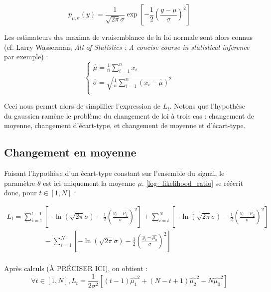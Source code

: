 \documentclass[french,12pt,notitlepage]{report}
\begin{document}
	\begin{equation*}
		p_{\mu, \sigma}(y) = \frac1{\sqrt{2 \pi} \sigma} \exp \left[ -\frac12 \left( \frac{y - \mu}{\sigma} \right)^2 \right]
	\end{equation*}

	Les estimateurs des maxima de vraisemblance de la loi normale sont alors connus (cf. Larry Wasserman, \textit{All of Statistics : A concise course in statistical inference} par exemple) :
	\begin{equation}
	\left\{
	\begin{array}{ll}
		\hat{\mu} = \frac{1}{n} \sum_{i=1}^n x_i \\
		\hat{\sigma} = \sqrt{\frac{1}{n} \sum_{i=1}^n (x_i - \hat{\mu})^2} \\
	\end{array}
	\right.
	\label{estimators}
	\end{equation}

	Ceci nous permet alors de simplifier l'expression de $L_t$. Notons que l'hypothèse du gaussien ramène le problème du changement de loi à trois cas : changement de moyenne, changement d'écart-type, et changement de moyenne et d'écart-type.

	\subsection{Changement en moyenne}
	Faisant l'hypothèse d'un écart-type constant sur l'ensemble du signal, le paramètre $\theta$ est ici uniquement la moyenne $\mu$. \ref{log_likelihood_ratio} se réécrit donc, pour $t \in [1,N]$ :

	\begin{equation*}
	\begin{array}{ll}
		L_t = \sum_{i=1}^{t-1} \left[-\ln (\sqrt{2 \pi} \sigma)-\frac{1}{2}\left( \frac{y_i-\hat{\mu_1}}{\sigma} \right) ^2 \right] + \sum_{i=t}^{N} \left[-\ln (\sqrt{2 \pi} \sigma)-\frac{1}{2}\left( \frac{y_i-\hat{\mu_2}}{\sigma} \right) ^2 \right] \\
		~~~~~~~~~~~~~~~~~~~~~~~~ - \sum_{i=1}^{N} \left[-\ln (\sqrt{2 \pi} \sigma)-\frac{1}{2}\left( \frac{y_i-\hat{\mu_0}}{\sigma} \right) ^2 \right] \\
	\end{array}
	\end{equation*}

	Après calculs (À PRÉCISER ICI), on obtient :
	\begin{equation}
		\forall t \in [1, N], L_t = \frac{1}{2 \sigma ^2}\left[(t-1)\hat{\mu_1}^2 + (N - t + 1)\hat{\mu_2}^2 - N\hat{\mu_0}^2 \right]
		\label{meanchange}
	\end{equation}
\end{document}
